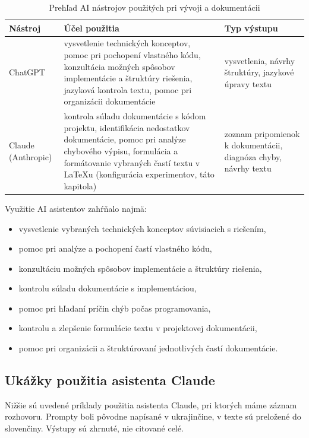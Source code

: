 \begin{table}[h]
\centering
\small
\caption{Prehľad AI nástrojov použitých pri vývoji a dokumentácii}
\label{tab:ai-tools}
\renewcommand{\arraystretch}{1.25}
\begin{tabular}{@{}>{\raggedright\arraybackslash}p{2.6cm} >{\raggedright\arraybackslash}p{5.2cm} >{\raggedright\arraybackslash}p{5.4cm}@{}}
\toprule
\textbf{Nástroj} & \textbf{Účel použitia} & \textbf{Typ výstupu} \\
\midrule
ChatGPT & vysvetlenie technických konceptov, pomoc pri pochopení vlastného kódu, konzultácia možných spôsobov implementácie a štruktúry riešenia, jazyková kontrola textu, pomoc pri organizácii dokumentácie & vysvetlenia, návrhy štruktúry, jazykové úpravy textu \\
Claude (Anthropic) & kontrola súladu dokumentácie s kódom projektu, identifikácia nedostatkov dokumentácie, pomoc pri analýze chybového výpisu, formulácia a formátovanie vybraných častí textu v \LaTeX{}u (konfigurácia experimentov, táto kapitola) & zoznam pripomienok k dokumentácii, diagnóza chyby, návrhy textu \\
\bottomrule
\end{tabular}
\end{table}

Využitie AI asistentov zahŕňalo najmä:

\begin{itemize}
    \item vysvetlenie vybraných technických konceptov súvisiacich s riešením,
    \item pomoc pri analýze a pochopení častí vlastného kódu,
    \item konzultáciu možných spôsobov implementácie a štruktúry riešenia,
    \item kontrolu súladu dokumentácie s implementáciou,
    \item pomoc pri hľadaní príčin chýb počas programovania,
    \item kontrolu a zlepšenie formulácie textu v projektovej dokumentácii,
    \item pomoc pri organizácii a štruktúrovaní jednotlivých častí dokumentácie.
\end{itemize}

\subsection{Ukážky použitia asistenta Claude}

Nižšie sú uvedené príklady použitia asistenta Claude, pri ktorých máme záznam rozhovoru. Prompty boli pôvodne napísané v ukrajinčine, v texte sú preložené do slovenčiny. Výstupy sú zhrnuté, nie citované celé.

